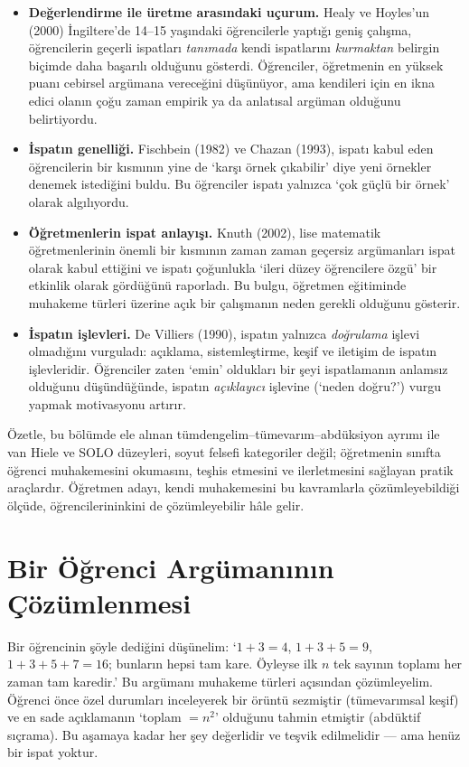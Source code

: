 \begin{itemize}[leftmargin=1.4em]
\item \textbf{Değerlendirme ile üretme arasındaki uçurum.} Healy ve Hoyles’un (2000) İngiltere’de 14–15 yaşındaki öğrencilerle yaptığı geniş çalışma, öğrencilerin geçerli ispatları \emph{tanımada} kendi ispatlarını \emph{kurmaktan} belirgin biçimde daha başarılı olduğunu gösterdi. Öğrenciler, öğretmenin en yüksek puanı cebirsel argümana vereceğini düşünüyor, ama kendileri için en ikna edici olanın çoğu zaman empirik ya da anlatısal argüman olduğunu belirtiyordu.
\item \textbf{İspatın genelliği.} Fischbein (1982) ve Chazan (1993), ispatı kabul eden öğrencilerin bir kısmının yine de ‘karşı örnek çıkabilir’ diye yeni örnekler denemek istediğini buldu. Bu öğrenciler ispatı yalnızca ‘çok güçlü bir örnek’ olarak algılıyordu.
\item \textbf{Öğretmenlerin ispat anlayışı.} Knuth (2002), lise matematik öğretmenlerinin önemli bir kısmının zaman zaman geçersiz argümanları ispat olarak kabul ettiğini ve ispatı çoğunlukla ‘ileri düzey öğrencilere özgü’ bir etkinlik olarak gördüğünü raporladı. Bu bulgu, öğretmen eğitiminde muhakeme türleri üzerine açık bir çalışmanın neden gerekli olduğunu gösterir.
\item \textbf{İspatın işlevleri.} De Villiers (1990), ispatın yalnızca \emph{doğrulama} işlevi olmadığını vurguladı: açıklama, sistemleştirme, keşif ve iletişim de ispatın işlevleridir. Öğrenciler zaten ‘emin’ oldukları bir şeyi ispatlamanın anlamsız olduğunu düşündüğünde, ispatın \emph{açıklayıcı} işlevine (‘neden doğru?’) vurgu yapmak motivasyonu artırır.
\end{itemize}

Özetle, bu bölümde ele alınan tümdengelim–tümevarım–abdüksiyon ayrımı ile van Hiele ve SOLO düzeyleri, soyut felsefi kategoriler değil; öğretmenin sınıfta öğrenci muhakemesini okumasını, teşhis etmesini ve ilerletmesini sağlayan pratik araçlardır. Öğretmen adayı, kendi muhakemesini bu kavramlarla çözümleyebildiği ölçüde, öğrencilerininkini de çözümleyebilir hâle gelir.

\section{Bir Öğrenci Argümanının Çözümlenmesi}

Bir öğrencinin şöyle dediğini düşünelim: ‘$1+3=4$, $1+3+5=9$, $1+3+5+7=16$; bunların hepsi tam kare. Öyleyse ilk $n$ tek sayının toplamı her zaman tam karedir.’ Bu argümanı muhakeme türleri açısından çözümleyelim. Öğrenci önce özel durumları inceleyerek bir örüntü sezmiştir (tümevarımsal keşif) ve en sade açıklamanın ‘toplam $=n^2$’ olduğunu tahmin etmiştir (abdüktif sıçrama). Bu aşamaya kadar her şey değerlidir ve teşvik edilmelidir — ama henüz bir ispat yoktur.

